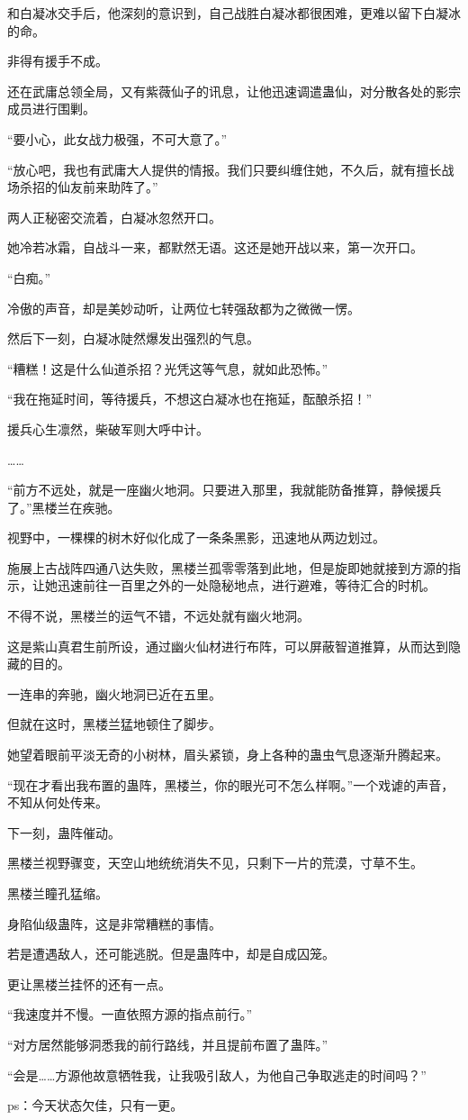 \begin{this_body}
和白凝冰交手后，他深刻的意识到，自己战胜白凝冰都很困难，更难以留下白凝冰的命。

非得有援手不成。

还在武庸总领全局，又有紫薇仙子的讯息，让他迅速调遣蛊仙，对分散各处的影宗成员进行围剿。

“要小心，此女战力极强，不可大意了。”

“放心吧，我也有武庸大人提供的情报。我们只要纠缠住她，不久后，就有擅长战场杀招的仙友前来助阵了。”

两人正秘密交流着，白凝冰忽然开口。

她冷若冰霜，自战斗一来，都默然无语。这还是她开战以来，第一次开口。

“白痴。”

冷傲的声音，却是美妙动听，让两位七转强敌都为之微微一愣。

然后下一刻，白凝冰陡然爆发出强烈的气息。

“糟糕！这是什么仙道杀招？光凭这等气息，就如此恐怖。”

“我在拖延时间，等待援兵，不想这白凝冰也在拖延，酝酿杀招！”

援兵心生凛然，柴破军则大呼中计。

……

“前方不远处，就是一座幽火地洞。只要进入那里，我就能防备推算，静候援兵了。”黑楼兰在疾驰。

视野中，一棵棵的树木好似化成了一条条黑影，迅速地从两边划过。

施展上古战阵四通八达失败，黑楼兰孤零零落到此地，但是旋即她就接到方源的指示，让她迅速前往一百里之外的一处隐秘地点，进行避难，等待汇合的时机。

不得不说，黑楼兰的运气不错，不远处就有幽火地洞。

这是紫山真君生前所设，通过幽火仙材进行布阵，可以屏蔽智道推算，从而达到隐藏的目的。

一连串的奔驰，幽火地洞已近在五里。

但就在这时，黑楼兰猛地顿住了脚步。

她望着眼前平淡无奇的小树林，眉头紧锁，身上各种的蛊虫气息逐渐升腾起来。

“现在才看出我布置的蛊阵，黑楼兰，你的眼光可不怎么样啊。”一个戏谑的声音，不知从何处传来。

下一刻，蛊阵催动。

黑楼兰视野骤变，天空山地统统消失不见，只剩下一片的荒漠，寸草不生。

黑楼兰瞳孔猛缩。

身陷仙级蛊阵，这是非常糟糕的事情。

若是遭遇敌人，还可能逃脱。但是蛊阵中，却是自成囚笼。

更让黑楼兰挂怀的还有一点。

“我速度并不慢。一直依照方源的指点前行。”

“对方居然能够洞悉我的前行路线，并且提前布置了蛊阵。”

“会是……方源他故意牺牲我，让我吸引敌人，为他自己争取逃走的时间吗？”

ps：今天状态欠佳，只有一更。

\end{this_body}

